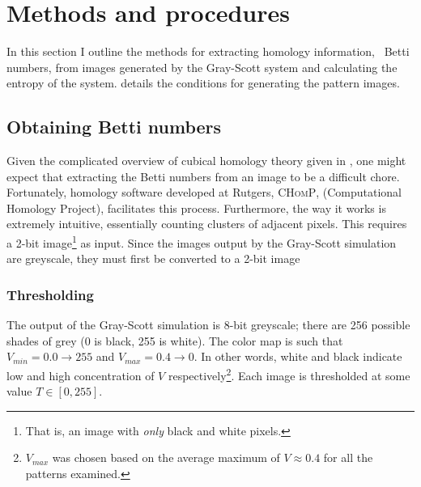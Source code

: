 \chapter{Methods and procedures} \label{ch:methods}

In this section I outline the methods for extracting homology information, \ie~Betti numbers, from images generated by the Gray-Scott system and calculating the entropy of the system.  details the conditions for generating the pattern images.

\section{Obtaining Betti numbers}

Given the complicated overview of cubical homology theory given in , one might expect that extracting the Betti numbers from an image to be a difficult chore. Fortunately, homology software developed at Rutgers, \textsc{CHomP}, (Computational Homology Project), facilitates this process. Furthermore, the way it works is extremely intuitive, essentially counting clusters of adjacent pixels. This requires a 2-bit image\footnote{That is, an image with \emph{only} black and white pixels.} as input. Since the images output by the Gray-Scott simulation are greyscale, they must first be converted to a 2-bit image

\subsection{Thresholding}

The output of the Gray-Scott simulation is 8-bit greyscale; there are 256 possible shades of grey (0 is black, 255 is white). The color map is such that $V_{min} = 0.0 \rightarrow 255$ and $V_{max} = 0.4 \rightarrow 0$. In other words, white and black indicate low and high concentration of $V$ respectively\footnote{$V_{max}$ was chosen based on the average maximum of $V \approx 0.4$ for all the patterns examined.}. Each image is thresholded at some value $T \in [0,255]$.


